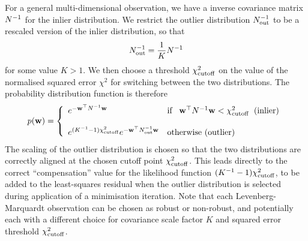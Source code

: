 \documentclass{article}
\begin{document}
For a general multi-dimensional observation, we have a inverse covariance
matrix $N^{-1}$ for the inlier distribution.
We restrict the outlier distribution $N_{\rm out}^{-1}$ to be a rescaled version
of the inlier distribution, so that
\[ N_{\rm out}^{-1} = \frac{1}{K} N^{-1}
\]
for some value $K>1$. We then choose a threshold $\chi_{\rm cutoff}^2$
on the value of the normalised squared error $\chi^2$ for switching between
the two distributions. The probability distribution function is therefore
\[ p({\bf w}) = \left\{ \begin{array}{ll} e^{-{\bf w}^{\top} N^{-1} {\bf w}} &
    \mbox{if}\;\;\;{\bf w}^{\top} N^{-1} {\bf w} < \chi_{\rm cutoff}^2\;\;\mbox{(inlier)} \\&\\
		 e^{(K^{-1} -1)\chi_{\rm cutoff}^2} e^{-{\bf w}^{\top} N_{\rm out}^{-1} {\bf w}}
  & \mbox{otherwise (outlier)} \end{array} \right.
\]
The scaling of the outlier distribution is chosen so that the two distributions
are correctly aligned at the chosen cutoff point $\chi_{\rm cutoff}^2$.
This leads directly to the correct ``compensation'' value for the likelihood
function $(K^{-1} - 1)\chi_{\rm cutoff}^2$, to be added to the least-squares
residual when the outlier distribution is selected during application
of a minimisation iteration.
Note that each Levenberg-Marquardt observation can be chosen as robust
or non-robust, and potentially each with a different choice for
covariance scale factor $K$ and squared error threshold $\chi_{\rm cutoff}^2$.
\end{document}
